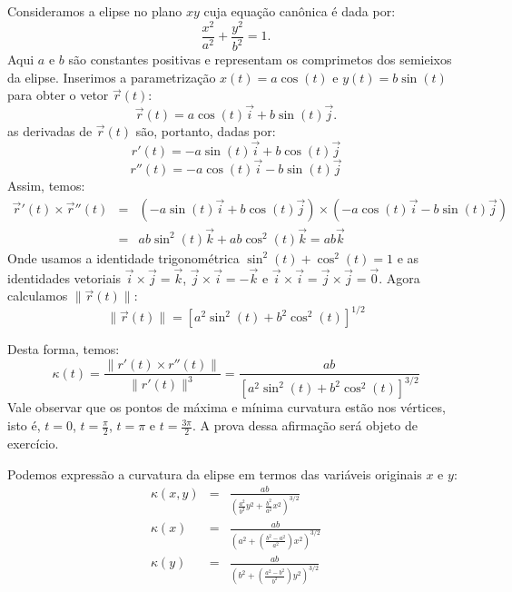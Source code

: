 \begin{ex} Consideramos a elipse no plano $xy$ cuja equação canônica é dada por:
  $$\frac{x^2}{a^2} + \frac{y^2}{b^2} = 1. $$
  Aqui $a$ e $b$ são constantes positivas e representam os comprimetos dos semieixos da elipse.
  Inserimos a parametrização $x(t)=a\cos(t)$ e $y(t)=b\sin(t)$ para obter o vetor $\vec{r}(t)$:
  $$\vec{r}(t) = a\cos(t)\vec{i} + b\sin(t)\vec{j}.$$
  as derivadas de $\vec{r}(t)$ são, portanto, dadas por:
$$r'(t)=-a\sin(t)\vec{i}+b\cos(t)\vec{j}$$  
$$r''(t)=-a\cos(t)\vec{i}-b\sin(t)\vec{j}$$
Assim, temos:
\begin{eqnarray*}\vec{r}'(t)\times\vec{r}''(t)&=&\left(-a\sin(t)\vec{i}+b\cos(t)\vec{j}\right)\times\left(-a\cos(t)\vec{i}-b\sin(t)\vec{j}\right)\\
&=&ab\sin^2(t)\vec{k}+ab\cos^2(t)\vec{k}=ab\vec{k}
\end{eqnarray*}
Onde usamos a identidade trigonométrica $\sin^2(t)+\cos^2(t)=1$ e as identidades vetoriais $\vec{i}\times\vec{j}=\vec{k}$, $\vec{j}\times\vec{i}=-\vec{k}$  e $\vec{i}\times\vec{i}=\vec{j}\times\vec{j}=\vec{0}$.
Agora calculamos $\|\vec{r}(t)\|$:
$$\|\vec{r}(t)\|=\left[a^2\sin^2(t)+b^2\cos^2(t)\right]^{1/2}$$

Desta forma, temos:
$$\kappa(t)=\frac{\|r'(t)\times r''(t)\|}{\|r'(t)\|^3}=\frac{ab}{\left[a^2\sin^2(t)+b^2\cos^2(t)\right]^{3/2}}$$
Vale observar que os pontos de máxima e mínima curvatura estão nos vértices, isto é, $t=0$, $t=\frac{\pi}{2}$, $t=\pi$ e $t=\frac{3\pi}{2}$. A prova dessa afirmação será objeto de exercício.

Podemos expressão a curvatura da elipse em termos das variáveis originais $x$ e $y$:
\begin{eqnarray*}
\kappa(x, y)&=&\frac{ab}{\left(\frac{a^2}{b^2}y^2+\frac{b^2}{a^2}x^2\right)^{3/2}}\\
\kappa(x)&=&\frac{ab}{\left(a^2+\left(\frac{b^2-a^2}{a^2}\right)x^2\right)^{3/2}}\\
\kappa(y)&=&\frac{ab}{\left(b^2+\left(\frac{a^2-b^2}{b^2}\right)y^2\right)^{3/2}}\\
\end{eqnarray*}


\end{ex} 



